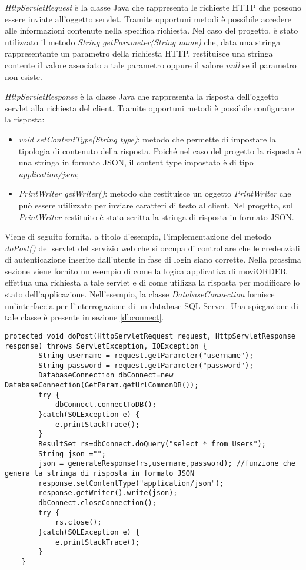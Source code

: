 \textit{HttpServletRequest} è la classe Java che rappresenta le richieste HTTP che possono essere inviate all'oggetto servlet. Tramite opportuni metodi è possibile accedere alle informazioni contenute nella specifica richiesta. Nel caso del progetto, è stato utilizzato il metodo \textit{String getParameter(String name)} che, data una stringa rappresentante un parametro della richiesta HTTP, restituisce una stringa contente il valore associato a tale parametro oppure il valore \textit{null} se il parametro non esiste.

\textit{HttpServletResponse} è la classe Java che rappresenta la risposta dell'oggetto servlet alla richiesta del client. Tramite opportuni metodi è possibile configurare la risposta:
\begin{itemize}
	\item \textit{void setContentType(String type)}: metodo che permette di impostare la tipologia di contenuto della risposta. Poiché nel caso del progetto la risposta è una stringa in formato JSON, il content type impostato è di tipo \textit{application/json};
	\item \textit{PrintWriter getWriter()}: metodo che restituisce un oggetto \textit{PrintWriter} che può essere utilizzato per inviare caratteri di testo al client. Nel progetto, sul \textit{PrintWriter} restituito è stata scritta la stringa di risposta in formato JSON.
\end{itemize}

Viene di seguito fornita, a titolo d'esempio, l'implementazione del metodo \textit{doPost()} del servlet del servizio web che si occupa di controllare che le credenziali di autenticazione inserite dall'utente in fase di login siano corrette. Nella prossima sezione viene fornito un esempio di come la logica applicativa di moviORDER effettua una richiesta a tale servlet e di come utilizza la risposta per modificare lo stato dell'applicazione. Nell'esempio, la classe \textit{DatabaseConnection} fornisce un'interfaccia per l'interrogazione di un database SQL Server. Una spiegazione di tale classe è presente in sezione \ref{dbconnect}.
\begin{lstlisting}
protected void doPost(HttpServletRequest request, HttpServletResponse response) throws ServletException, IOException {
		String username = request.getParameter("username");
		String password = request.getParameter("password");
		DatabaseConnection dbConnect=new DatabaseConnection(GetParam.getUrlCommonDB());
		try {
			dbConnect.connectToDB();
		}catch(SQLException e) {
			e.printStackTrace();
		} 
		ResultSet rs=dbConnect.doQuery("select * from Users");
		String json ="";
		json = generateResponse(rs,username,password); //funzione che genera la stringa di risposta in formato JSON
		response.setContentType("application/json");
		response.getWriter().write(json);
		dbConnect.closeConnection();
		try {
			rs.close();
		}catch(SQLException e) {
			e.printStackTrace();
		}
	}
\end{lstlisting}


